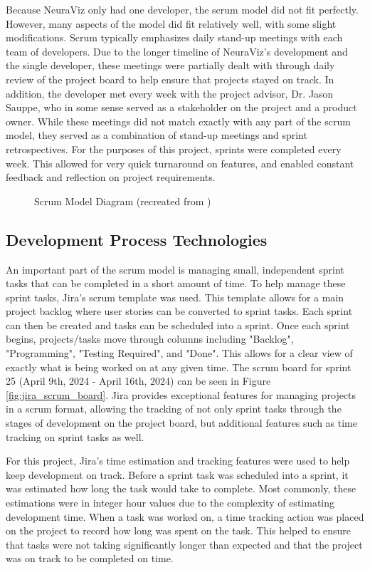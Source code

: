 Because NeuraViz only had one developer, the scrum model did not fit perfectly. However, many aspects of the model did fit relatively well, with some slight modifications. Scrum typically emphasizes daily stand-up meetings with each team of developers. Due to the longer timeline of NeuraViz's development and the single developer, these meetings were partially dealt with through daily review of the project board to help ensure that projects stayed on track. In addition, the developer met every week with the project advisor, Dr. Jason Sauppe, who in some sense served as a stakeholder on the project and a product owner. While these meetings did not match exactly with any part of the scrum model, they served as a combination of stand-up meetings and sprint retrospectives. For the purposes of this project, sprints were completed every week. This allowed for very quick turnaround on features, and enabled constant feedback and reflection on project requirements.

\begin{figure}[htb]
    \centering
    
    \caption[Scrum Model Diagram]{Scrum Model Diagram (recreated from \cite{tutorialspoint})}
    \label{fig:scrum_model}
\end{figure}

\subsection{Development Process Technologies}
An important part of the scrum model is managing small, independent sprint tasks that can be completed in a short amount of time. To help manage these sprint tasks, Jira's \cite{jira} scrum template was used. This template allows for a main project backlog where user stories can be converted to sprint tasks. Each sprint can then be created and tasks can be scheduled into a sprint. Once each sprint begins, projects/tasks move through columns including "Backlog", "Programming", "Testing Required", and "Done". This allows for a clear view of exactly what is being worked on at any given time. The scrum board for sprint 25 (April 9th, 2024 - April 16th, 2024) can be seen in Figure \ref{fig:jira_scrum_board}. Jira provides exceptional features for managing projects in a scrum format, allowing the tracking of not only sprint tasks through the stages of development on the project board, but additional features such as time tracking on sprint tasks as well.

For this project, Jira's time estimation and tracking features were used to help keep development on track. Before a sprint task was scheduled into a sprint, it was estimated how long the task would take to complete. Most commonly, these estimations were in integer hour values due to the complexity of estimating development time. When a task was worked on, a time tracking action was placed on the project to record how long was spent on the task. This helped to ensure that tasks were not taking significantly longer than expected and that the project was on track to be completed on time.

